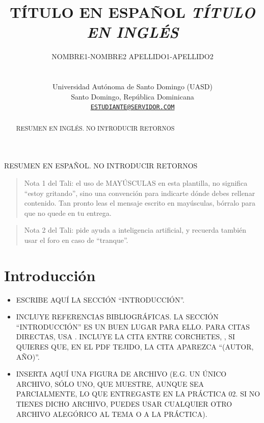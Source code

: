 \documentclass[spanish]{article}
\title{TÍTULO EN ESPAÑOL \newline \textit{\large TÍTULO EN INGLÉS}}
\author{
    \parbox[t]{10cm}{\centering NOMBRE1-NOMBRE2 APELLIDO1-APELLIDO2 \\ \orcidlink{CÓDIGO ORCID}}
   \\
    Universidad Autónoma de Santo Domingo (UASD) \\
  Santo Domingo, República Dominicana \\
  \texttt{\href{mailto:ESTUDIANTE@SERVIDOR.COM}{\nolinkurl{ESTUDIANTE@SERVIDOR.COM}}} \\
  }
\begin{document}
\maketitle


\begin{resumen}
RESUMEN EN ESPAÑOL. NO INTRODUCIR RETORNOS
\end{resumen}



\begin{abstract}
RESUMEN EN INGLÉS. NO INTRODUCIR RETORNOS
\end{abstract}


\begin{quote}
Nota 1 del Tali: el uso de MAYÚSCULAS en esta plantilla, no significa
``estoy gritando'', sino una convención para indicarte dónde debes
rellenar contenido. Tan pronto leas el mensaje escrito en mayúsculas,
bórralo para que no quede en tu entrega.
\end{quote}

\begin{quote}
Nota 2 del Tali: pide ayuda a inteligencia artificial, y recuerda
también usar el foro en caso de ``tranque''.
\end{quote}

\section{Introducción}\label{introducciuxf3n}

\begin{itemize}
\item
  ESCRIBE AQUÍ LA SECCIÓN ``INTRODUCCIÓN''.
\item
  INCLUYE REFERENCIAS BIBLIOGRÁFICAS. LA SECCIÓN ``INTRODUCCIÓN'' ES UN
  BUEN LUGAR PARA ELLO. PARA CITAS DIRECTAS, USA
  \textcite{ETIQUETA_BIBTEX}. INCLUYE LA CITA ENTRE CORCHETES,
  \autocite{ETIQUETA_BIBTEX}, SI QUIERES QUE, EN EL PDF TEJIDO, LA CITA
  APAREZCA ``(AUTOR, AÑO)''.
\item
  INSERTA AQUÍ UNA FIGURA DE ARCHIVO (E.G. UN ÚNICO ARCHIVO, SÓLO UNO,
  QUE MUESTRE, AUNQUE SEA PARCIALMENTE, LO QUE ENTREGASTE EN LA PRÁCTICA
  02. SI NO TIENES DICHO ARCHIVO, PUEDES USAR CUALQUIER OTRO ARCHIVO
  ALEGÓRICO AL TEMA O A LA PRÁCTICA).
\end{itemize}
\end{document}
